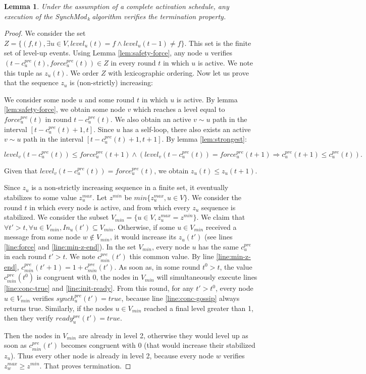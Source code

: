 \documentclass[11pt,letterpaper]{article}
\newtheorem{lem}[thm]{Lemma}
\newcommand{\SM}{{\em SynchMod}$_{\,k}\ $}
\begin{document}
\begin{lem}
	Under the assumption of a complete activation schedule,
	any execution of the \SM algorithm verifies the termination property.
\end{lem}
\begin{proof}
	We consider the set $Z = \{(f,t), \exists u \in V, level_u(t) = f \wedge level_u(t-1) \neq f\}$.
	This set is the finite set of level-up events.
	Using Lemma \ref{lem:safety-force}, any node $u$ verifies $(t-c_u^{pre}(t), force_u^{pre}(t)) \in Z$ in every round $t$ in which $u$ is active.
	We note this tuple as $z_u(t)$.
	We order $Z$ with lexicographic ordering.
	Now let us prove that the sequence $z_u$ is (non-strictly) increasing:

	We consider some node $u$ and some round $t$ in which $u$ is active.
	By lemma \ref{lem:safety-force}, we obtain some node $v$ which reaches a level equal to $force_u^{pre}(t)$ in round $t-c_u^{pre}(t)$.
	We also obtain an active $v \sim u$ path in the interval $[t-c_u^{pre}(t)+1,t]$.
	Since $u$ has a self-loop, there also exists an active $v \sim u$ path in the interval $[t-c_u^{pre}(t)+1,t+1]$.
	By lemma \ref{lem:strongest}:

	$$level_v(t-c_u^{pre}(t)) \leq force_u^{pre}(t+1) \wedge (level_v(t-c_u^{pre}(t)) = force_u^{pre}(t+1) \Rightarrow c^{pre}_u(t+1) \leq c_u^{pre}(t)).$$
	
	Given that $level_v(t-c_u^{pre}(t)) = force_u^{pre}(t)$, we obtain $z_u(t) \leq z_u(t+1)$.

	Since $z_u$ is a non-strictly increasing sequence in a finite set, it eventually stabilizes to some value $z_u^{max}$.
	Let $z^{min}$ be $min \{z_u^{max}, u \in V\}$.
	We consider the round $t$ in which every node is active, and from which every $z_u$ sequence is stabilized.
	We consider the subset $V_{min} = \{u \in V, z_u^{max} = z^{min}\}$.
	We claim that $\forall t' > t, \forall u \in V_{min}, In_u(t') \subseteq V_{min}$.
	Otherwise, if some $u \in V_{min}$ received a message from some node $w \notin V_{min}$,
	it would increase its $z_u(t')$ (see lines \ref{line:force} and \ref{line:min-z-end}).
	In the set $V_{min}$, every node $u$ has the same $c_u^{pre}$ in each round $t' > t$.
	We note $c^{pre}_{min}(t')$ this common value.
	By line \ref{line:min-z-end}, $c^{pre}_{min}(t'+1) = 1+c^{pre}_{min}(t')$.
	As soon as, in some round $t^0 > t$, the value $c^{pre}_{min}(t^0)$ is congruent with 0, the nodes in $V_{min}$ will simultaneously execute lines \ref{line:conc-true} and \ref{line:init-ready}.
	From this round, for any $t' > t^0$, every node $u \in V_{min}$ verifies $synch^{pre}_u(t') = true$, because line \ref{line:conc-gossip} always returns true.
	Similarly, if the nodes $u \in V_{min}$ reached a final level greater than 1, then they verify $ready^{pre}_u(t') = true$.

	Then the nodes in $V_{min}$ are already in level 2, otherwise they would level up as soon as $c^{pre}_{min}(t')$ becomes congruent with 0 (that would increase their stabilized $z_u$).
	Thus every other node is already in level 2, because every node $w$ verifies $z_w^{max} \geq z^{min}$.
	That proves termination.
\end{proof}
\end{document}
